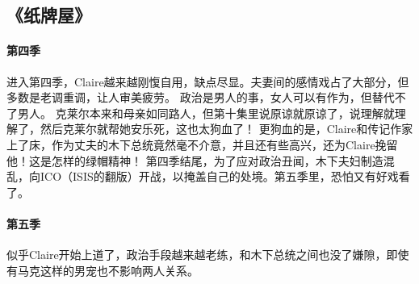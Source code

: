 \subsection{《纸牌屋》}
\paragraph{第四季}

进入第四季，Claire越来越刚愎自用，缺点尽显。夫妻间的感情戏占了大部分，但多数是老调重调，让人审美疲劳。 
政治是男人的事，女人可以有作为，但替代不了男人。 
克莱尔本来和母亲如同路人，但第十集里说原谅就原谅了，说理解就理解了，然后克莱尔就帮她安乐死，这也太狗血了！ 
更狗血的是，Claire和传记作家上了床，作为丈夫的木下总统竟然毫不介意，并且还有些高兴，还为Claire挽留他！这是怎样的绿帽精神！ 
第四季结尾，为了应对政治丑闻，木下夫妇制造混乱，向ICO（ISIS的翻版）开战，以掩盖自己的处境。第五季里，恐怕又有好戏看了。

\paragraph{第五季}

似乎Claire开始上道了，政治手段越来越老练，和木下总统之间也没了嫌隙，即使有马克这样的男宠也不影响两人关系。